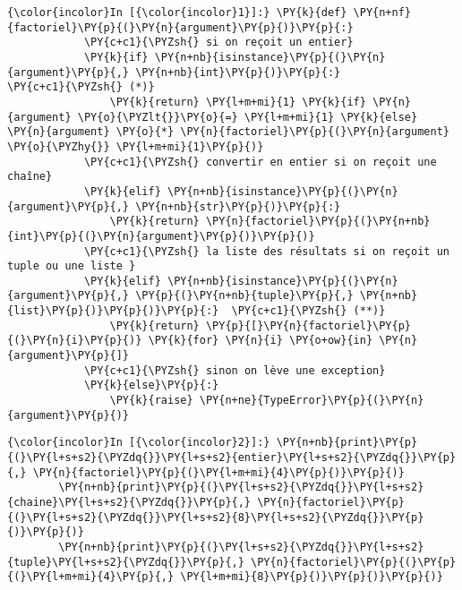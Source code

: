     \begin{Verbatim}[commandchars=\\\{\},frame=single,framerule=0.3mm,rulecolor=\color{cellframecolor}]
{\color{incolor}In [{\color{incolor}1}]:} \PY{k}{def} \PY{n+nf}{factoriel}\PY{p}{(}\PY{n}{argument}\PY{p}{)}\PY{p}{:}
            \PY{c+c1}{\PYZsh{} si on reçoit un entier}
            \PY{k}{if} \PY{n+nb}{isinstance}\PY{p}{(}\PY{n}{argument}\PY{p}{,} \PY{n+nb}{int}\PY{p}{)}\PY{p}{:}              \PY{c+c1}{\PYZsh{} (*)}
                \PY{k}{return} \PY{l+m+mi}{1} \PY{k}{if} \PY{n}{argument} \PY{o}{\PYZlt{}}\PY{o}{=} \PY{l+m+mi}{1} \PY{k}{else} \PY{n}{argument} \PY{o}{*} \PY{n}{factoriel}\PY{p}{(}\PY{n}{argument} \PY{o}{\PYZhy{}} \PY{l+m+mi}{1}\PY{p}{)}
            \PY{c+c1}{\PYZsh{} convertir en entier si on reçoit une chaîne}
            \PY{k}{elif} \PY{n+nb}{isinstance}\PY{p}{(}\PY{n}{argument}\PY{p}{,} \PY{n+nb}{str}\PY{p}{)}\PY{p}{:}
                \PY{k}{return} \PY{n}{factoriel}\PY{p}{(}\PY{n+nb}{int}\PY{p}{(}\PY{n}{argument}\PY{p}{)}\PY{p}{)}
            \PY{c+c1}{\PYZsh{} la liste des résultats si on reçoit un tuple ou une liste }
            \PY{k}{elif} \PY{n+nb}{isinstance}\PY{p}{(}\PY{n}{argument}\PY{p}{,} \PY{p}{(}\PY{n+nb}{tuple}\PY{p}{,} \PY{n+nb}{list}\PY{p}{)}\PY{p}{)}\PY{p}{:}  \PY{c+c1}{\PYZsh{} (**)}
                \PY{k}{return} \PY{p}{[}\PY{n}{factoriel}\PY{p}{(}\PY{n}{i}\PY{p}{)} \PY{k}{for} \PY{n}{i} \PY{o+ow}{in} \PY{n}{argument}\PY{p}{]}
            \PY{c+c1}{\PYZsh{} sinon on lève une exception}
            \PY{k}{else}\PY{p}{:}
                \PY{k}{raise} \PY{n+ne}{TypeError}\PY{p}{(}\PY{n}{argument}\PY{p}{)}
\end{Verbatim}


    \begin{Verbatim}[commandchars=\\\{\},frame=single,framerule=0.3mm,rulecolor=\color{cellframecolor}]
{\color{incolor}In [{\color{incolor}2}]:} \PY{n+nb}{print}\PY{p}{(}\PY{l+s+s2}{\PYZdq{}}\PY{l+s+s2}{entier}\PY{l+s+s2}{\PYZdq{}}\PY{p}{,} \PY{n}{factoriel}\PY{p}{(}\PY{l+m+mi}{4}\PY{p}{)}\PY{p}{)}
        \PY{n+nb}{print}\PY{p}{(}\PY{l+s+s2}{\PYZdq{}}\PY{l+s+s2}{chaine}\PY{l+s+s2}{\PYZdq{}}\PY{p}{,} \PY{n}{factoriel}\PY{p}{(}\PY{l+s+s2}{\PYZdq{}}\PY{l+s+s2}{8}\PY{l+s+s2}{\PYZdq{}}\PY{p}{)}\PY{p}{)}
        \PY{n+nb}{print}\PY{p}{(}\PY{l+s+s2}{\PYZdq{}}\PY{l+s+s2}{tuple}\PY{l+s+s2}{\PYZdq{}}\PY{p}{,} \PY{n}{factoriel}\PY{p}{(}\PY{p}{(}\PY{l+m+mi}{4}\PY{p}{,} \PY{l+m+mi}{8}\PY{p}{)}\PY{p}{)}\PY{p}{)}
\end{Verbatim}


